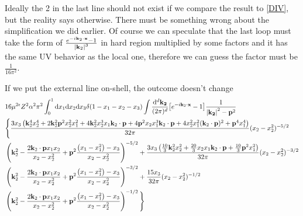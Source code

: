 \documentclass[aps,prd,preprint,showkeys,notitlepage,10pt]{revtex4-1}
\newcommand{\vbp}{\vb{p}}
\newcommand{\vbk}{\vb{k}}
\renewcommand{\a}{\alpha}
\begin{document}
Ideally the 2 in the last line should not exist if we compare the result to \eqref{DIV}, but the reality says otherwise. There must be something wrong about the simplification we did earlier. Of course we can speculate that the last loop must take the form of $\frac{e^{-i\vb{k}_2\cdot\vb{x}}-1}{\abs{\vbk_2}^3}$ in hard region multiplied by some factors and it has the same UV behavior as the local one, therefore we can guess the factor must be $\frac{1}{16\pi^2}$. 

If we put the external line on-shell, the outcome doesn't change
\begin{align*}
	& 16\mu^{2\epsilon}Z^2\a^2\pi^2\int_0^1\dd x_1\dd x_2\dd x_3\delta(1-x_1-x_2-x_3)
	\int\frac{\dd^d\vb{k_2}}{(2\pi)^d}\bqty{e^{-i\vb{k}_2\cdot\vb{x}}-1}\frac{1}{\vb{\abs{k_2}}^2-\vbp^2}\\&
	\Bigg\{\frac{3 x_3 \left(\vbk_2^4 x_2^4+2 \vbk_2^2 \vbp^2 x_2^2 x_1^2+4 \vbk_2^2 x_2^3 x_1 \vbk_2\cdot\vbp+4 \vbp^2 x_2 x_1^3 \vbk_2\cdot\vbp+4 x_2^2 x_1^2 (\vbk_2\cdot\vbp)^2+\vbp^4 x_1^4\right)}{32 \pi }(x_2 - x_2^2)^{-5/2}\\&
	\left(  \vbk_2^2-\frac{2 \vbk_2\cdot \vbp x_1 x_2 }{x_2-x_2^2}+\vbp^2\frac{ \left(x_1-x_1^2\right) - x_3}{x_2-x_2^2}  \right)^{-5/2}
	+\frac{3 x_3 \left(\frac{10}{3} \vbk_2^2 x_2^2+\frac{20}{3} x_2 x_1 \vbk_2\cdot\vbp+\frac{10}{3} \vbp^2 x_1^2\right)}{32 \pi }(x_2 - x_2^2)^{-3/2}\\&
	\left(  \vbk_2^2-\frac{2 \vbk_2\cdot \vbp x_1 x_2 }{x_2-x_2^2}+\vbp^2\frac{\left(x_1-x_1^2\right) - x_3}{x_2-x_2^2}  \right)^{-3/2}
	+\frac{15 x_3 }{32 \pi }(x_2 - x_2^2)^{-1/2}\\&
	\left(  \vbk_2^2-\frac{2 \vbk_2\cdot \vbp x_1 x_2 }{x_2-x_2^2}+\vbp^2\frac{ \left( x_1-x_1^2\right)- x_3}{x_2-x_2^2}  \right)^{-1/2}\Bigg\}
\end{align*}
\end{document}
